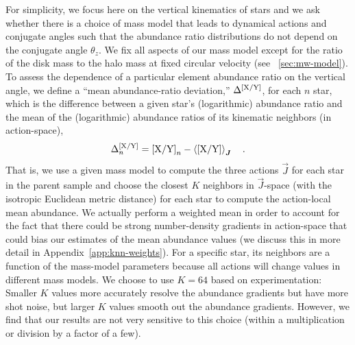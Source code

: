 \documentclass[modern]{aastex63}
\begin{document}
For simplicity, we focus here on the vertical kinematics of stars and we ask
whether there is a choice of mass model that leads to dynamical actions and
conjugate angles such that the abundance ratio distributions do not depend on
the conjugate angle $\theta_z$.
We fix all aspects of our mass model except for the ratio of the disk mass to
the halo mass at fixed circular velocity (see \sectionname~\ref{sec:mw-model}).
To assess the dependence of a particular element abundance ratio
 on the vertical angle, we define a ``mean abundance-ratio
deviation,'' $\Delta^{{[\mathrm{X}/\mathrm{Y}]}}$, for each $n$ star, which is the
difference between a given star's (logarithmic) abundance ratio and the mean of
the (logarithmic) abundance ratios of its kinematic neighbors (in action-space),
\begin{equation}
  \Delta^{\abunratio{X}{Y}}_n = \abunratio{X}{Y}_n -
    \mean{\abunratio{X}{Y}}_{\vec{J}}
    \quad . \label{eq:mean-abun-dev}
\end{equation}
That is, we use a given mass model to compute the three actions $\vec{J}$ for
each star in the parent sample and choose the closest $K$ neighbors in
$\vec{J}$-space (with the isotropic Euclidean metric distance) for each star to
compute the action-local mean abundance.
We actually perform a weighted mean in order to account for the fact that there
could be strong number-density gradients in action-space that could bias our
estimates of the mean abundance values (we discuss this in more detail in
Appendix~\ref{app:knn-weights}).
For a specific star, its neighbors are a function of the mass-model parameters
because all actions will change values in different mass models.
We choose to use $K=64$ based on experimentation: Smaller $K$ values more
accurately resolve the abundance gradients but have more shot noise, but larger
$K$ values smooth out the abundance gradients.
However, we find that our results are not very sensitive to this choice (within
a multiplication or division by a factor of a few).
\end{document}
